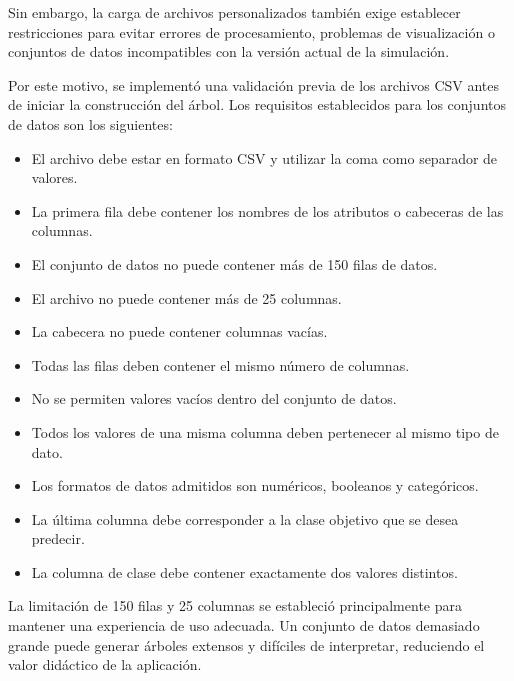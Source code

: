 Sin embargo, la carga de archivos personalizados también exige establecer restricciones para evitar errores de procesamiento, problemas de visualización o conjuntos de datos incompatibles con la versión actual de la simulación.

Por este motivo, se implementó una validación previa de los archivos CSV antes de iniciar la construcción del árbol. Los requisitos establecidos para los conjuntos de datos son los siguientes:

\begin{itemize}
    \item El archivo debe estar en formato CSV y utilizar la coma como separador de valores.
    
    \item La primera fila debe contener los nombres de los atributos o cabeceras de las columnas.
    
    \item El conjunto de datos no puede contener más de 150 filas de datos.
    
    \item El archivo no puede contener más de 25 columnas.
    
    \item La cabecera no puede contener columnas vacías.
    
    \item Todas las filas deben contener el mismo número de columnas.
    
    \item No se permiten valores vacíos dentro del conjunto de datos.
    
    \item Todos los valores de una misma columna deben pertenecer al mismo tipo de dato.
    
    \item Los formatos de datos admitidos son numéricos, booleanos y categóricos.
    
    \item La última columna debe corresponder a la clase objetivo que se desea predecir.
    
    \item La columna de clase debe contener exactamente dos valores distintos.
\end{itemize}

La limitación de 150 filas y 25 columnas se estableció principalmente para mantener una experiencia de uso adecuada. Un conjunto de datos demasiado grande puede generar árboles extensos y difíciles de interpretar, reduciendo el valor didáctico de la aplicación.

